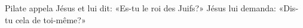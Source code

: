 \encetemps Pilate appela Jésus et lui dit:
	«Es-tu le roi des Juifs?»
Jésus lui demanda:
	«Dis-tu cela de toi-même?»
